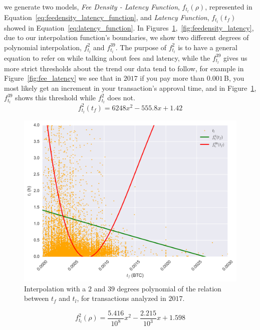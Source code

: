 \documentclass[USenglish]{uit-thesis}
\def\bitcoin{\leavevmode\rlap{\hskip.5pt-}B}
\begin{document}
we generate two models, \emph{Fee Density - Latency Function},
$f_{t_l}(\rho)$, represented in Equation~\ref{eq:feedensity_latency_function},
and \emph{Latency Function}, $f_{t_l}(t_f)$
showed in Equation~\ref{eq:latency_function}.
In Figures~\ref{fig:fee_latency_regression},~\ref{fig:feedensity_latency},
due to our interpolation function's boundaries, we
show two different degrees of
polynomial interpolation, $f_{t_l}^2$ and $f_{t_l}^{39}$.
The purpose of $f_{t_l}^2$ is to have a general equation
to refer on while talking about fees and latency, while
the $f_{t_l}^{39}$ gives us more strict thresholds about
the trend our data tend to follow, for example in
Figure~\ref{fig:fee_latency} we see that in
$2017$ if you pay more than $0.001$\,\bitcoin,
you most likely get an increment in your
transaction's approval time, and in
Figure~\ref{fig:fee_latency_regression},
$f_{t_l}^{39}$ shows this threshold while $f_{t_l}^2$ does not.
\begin{equation}
\label{eq:latency_function}
f_{t_l}^2 (t_f) = 6248x^2 - 555.8x + 1.42
\end{equation}
\begin{figure}[h]
	\centering
	\includegraphics[width=1\textwidth]{img/fee_latency_regression}
	\caption{Interpolation with a $2$ and $39$ degrees polynomial of the relation
		between $t_f$ and $t_l$, for transactions analyzed in $2017$.}
	\label{fig:fee_latency_regression}
\end{figure}
\begin{equation}
\label{eq:feedensity_latency_function}
f_{t_l}^2 (\rho) = \frac{5.416}{10^{8}} x^2 - \frac{2.215}{10^{3}}x + 1.598
\end{equation}
\end{document}
